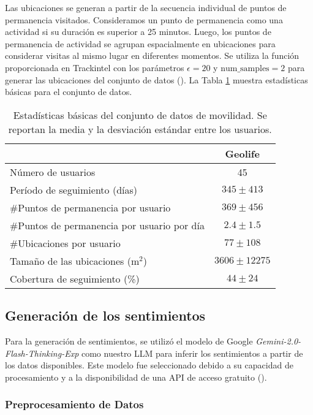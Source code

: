 Las ubicaciones se generan a partir de la secuencia individual 
de puntos de permanencia visitados. Consideramos un punto de permanencia como 
una actividad si su duraci\'on es superior a 25 minutos. Luego, los 
puntos de permanencia de actividad se agrupan espacialmente en ubicaciones 
para considerar visitas al mismo lugar en diferentes momentos. Se utiliza 
la funci\'on proporcionada en Trackintel con los par\'ametros 
$\epsilon = 20$ y $\text{num\_samples} = 2$ para generar las ubicaciones 
del conjunto de datos (\cite{Hong2021Clustering}). La Tabla \ref{tabla:estadisticas} 
muestra estad\'isticas b\'asicas para el conjunto de datos.\\

\begin{table}[h]
    \centering
    \caption{Estadísticas básicas del conjunto de datos de movilidad. Se reportan la media y la desviación estándar entre los usuarios.}
    \label{tabla:estadisticas}
    \begin{tabular}{lc}
        \hline
        & \textbf{Geolife} \\ \hline
        Número de usuarios & 45 \\
        Período de seguimiento (días) & $345 \pm 413$ \\
        \#Puntos de permanencia por usuario & $369 \pm 456$ \\
        \#Puntos de permanencia por usuario por día & $2.4 \pm 1.5$ \\
        \#Ubicaciones por usuario & $77 \pm 108$ \\
        Tamaño de las ubicaciones (m$^2$) & $3606 \pm 12275$ \\
        Cobertura de seguimiento (\%) & $44 \pm 24$ \\ \hline
    \end{tabular}
\end{table}

\subsection{Generaci\'on de los sentimientos}
Para la generación de sentimientos, se utilizó el modelo de Google \textit{Gemini-2.0-Flash-Thinking-Exp} 
como nuestro LLM para inferir los sentimientos a partir de 
los datos disponibles. Este modelo fue seleccionado debido a su capacidad de 
procesamiento y a la disponibilidad de una API de acceso gratuito (\cite{gemini_api_docs}).

\subsubsection{Preprocesamiento de Datos}

